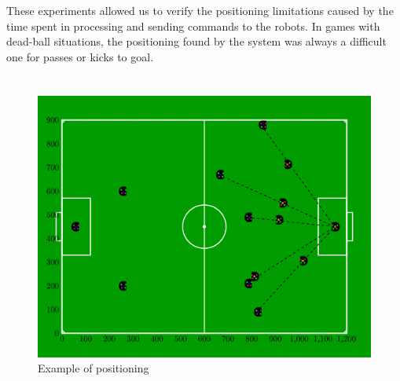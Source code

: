 \documentclass[a0,portrait]{sciposter}
\newcommand{\tituloA}[1]{\emph{\textbf{\color{white}{#1}}}}
\newcommand{\tituloB}[1]{\emph{\textbf{\color{blue}{#1}}}}
\begin{document}
\begin{multicols}{3}
\begin{adjustbox}{width=1\linewidth, center}
    \end{adjustbox}
\\

\subsection*{\tituloB{Results -- LARS 2018 matches}}
    These experiments allowed us to verify the positioning limitations caused by the time spent in processing and sending commands to the robots. In games with dead-ball situations, the positioning found by the system was always a difficult one for passes or kicks to goal.

\section*{\tituloA{Conclusions}}

    \begin{figure}[h!]
        \centering
        \includegraphics[width=1\linewidth]{resultadoclerc2002.png}
        {\small Example of positioning}
    \end{figure}


\end{multicols}
\end{document}
